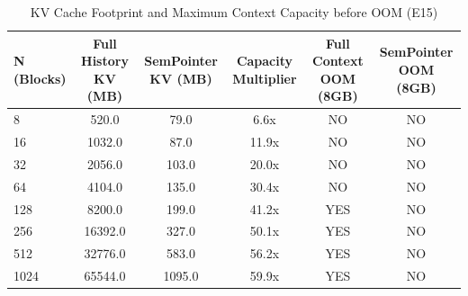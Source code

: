 \begin{table}
\caption{KV Cache Footprint and Maximum Context Capacity before OOM (E15)}
\label{tab:memory}
\begin{tabular}{lccccc}
\toprule
N (Blocks) & Full History KV (MB) & SemPointer KV (MB) & Capacity Multiplier & Full Context OOM (8GB) & SemPointer OOM (8GB) \\
\midrule
8 & 520.0 & 79.0 & 6.6x & NO & NO \\
16 & 1032.0 & 87.0 & 11.9x & NO & NO \\
32 & 2056.0 & 103.0 & 20.0x & NO & NO \\
64 & 4104.0 & 135.0 & 30.4x & NO & NO \\
128 & 8200.0 & 199.0 & 41.2x & YES & NO \\
256 & 16392.0 & 327.0 & 50.1x & YES & NO \\
512 & 32776.0 & 583.0 & 56.2x & YES & NO \\
1024 & 65544.0 & 1095.0 & 59.9x & YES & NO \\
\bottomrule
\end{tabular}
\end{table}
